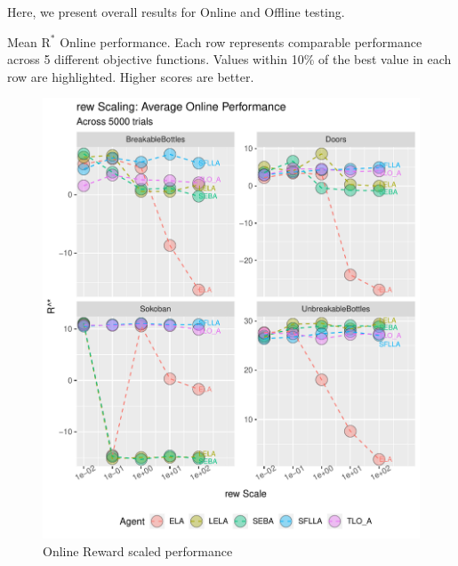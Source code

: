 Here, we present overall results for Online and Offline testing. 


\begin{table}[t]
\tiny
  \caption{Mean $\text{R}^*$ Online performance. Each row represents comparable performance across 5 different objective functions. Values within 10\% of the best value in each row are highlighted. Higher scores are better.}
  \label{tab:mean_r_star_performance}

\end{table}

\begin{figure}[h]
 
  \includegraphics[width=\columnwidth]{output/onlinerew.pdf}
  \caption{Online Reward scaled performance}
  \label{fig:offline_pen_performance}
\end{figure}


